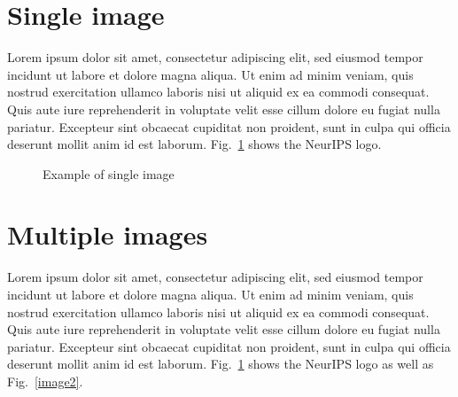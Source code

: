 \documentclass{article}
\begin{document}
\section{Single image}

Lorem ipsum dolor sit amet, consectetur adipiscing elit, sed eiusmod tempor incidunt ut labore et dolore magna aliqua. Ut enim ad minim veniam, quis nostrud exercitation ullamco laboris nisi ut aliquid ex ea commodi consequat. Quis aute iure reprehenderit in voluptate velit esse cillum dolore eu fugiat nulla pariatur. Excepteur sint obcaecat cupiditat non proident, sunt in culpa qui officia deserunt mollit anim id est laborum. Fig.~\ref{image1} shows the NeurIPS logo.


\begin{figure}[H]
  \caption{Example of single image}
  \label{image1}
\end{figure}


\section{Multiple images}

Lorem ipsum dolor sit amet, consectetur adipiscing elit, sed eiusmod tempor incidunt ut labore et dolore magna aliqua. Ut enim ad minim veniam, quis nostrud exercitation ullamco laboris nisi ut aliquid ex ea commodi consequat. Quis aute iure reprehenderit in voluptate velit esse cillum dolore eu fugiat nulla pariatur. Excepteur sint obcaecat cupiditat non proident, sunt in culpa qui officia deserunt mollit anim id est laborum. Fig.~\ref{image1} shows the NeurIPS logo as well as Fig.~\ref{image2}.
\end{document}
